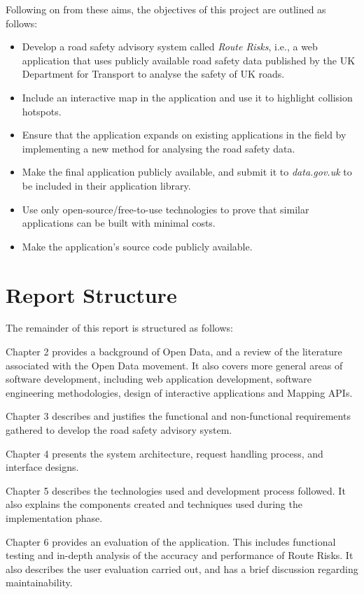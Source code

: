 \documentclass[authoryearcitations]{UoYCSproject}
\begin{document}
Following on from these aims, the objectives of this project are outlined as follows:

\begin{itemize}
	\item Develop a road safety advisory system called \emph{Route Risks}, i.e., a web application that uses publicly available road safety data published by the UK Department for Transport to analyse the safety of UK roads.
	\item Include an interactive map in the application and use it to highlight collision hotspots.
	\item Ensure that the application expands on existing applications in the field by implementing a new method for analysing the road safety data.
	\item Make the final application publicly available, and submit it to \textit{data.gov.uk} to be included in their application library.
	\item Use only open-source/free-to-use technologies to prove that similar applications can be built with minimal costs.
	\item Make the application's source code publicly available.
\end{itemize}


\section{Report Structure}
The remainder of this report is structured as follows:

Chapter 2 provides a background of Open Data, and a review of the literature associated with the Open Data movement. It also covers more general areas of software development, including web application development, software engineering methodologies, design of interactive applications and Mapping APIs.

Chapter 3 describes and justifies the functional and non-functional requirements gathered to develop the road safety advisory system.

Chapter 4 presents the system architecture, request handling process, and interface designs.

Chapter 5 describes the technologies used and development process followed. It also explains the components created and techniques used during the implementation phase.

Chapter 6 provides an evaluation of the application. This includes functional testing and in-depth analysis of the accuracy and performance of Route Risks. It also describes the user evaluation carried out, and has a brief discussion regarding maintainability.
\end{document}

